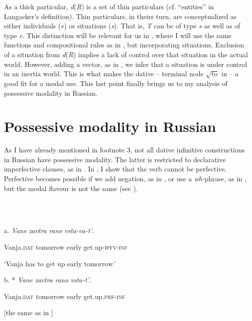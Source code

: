\documentclass[output=paper,colorlinks,citecolor=brown]{./langscibook}
\begin{document}
As a thick particular, \textit{d}(\textit{R}) is a set of thin particulars (cf. “entities” in Langacker’s definition). Thin particulars, in theirs turn, are conceptualized as either individuals (\textit{e}) or situations (\textit{s}). That is, \textit{T} can be of type \textit{s} as well as of type \textit{e}. This distinction will be relevant for us in , where I will use the same functions and compositional rules as in , but incorporating situations. Exclusion of a situation from \textit{d}(\textit{R}) implies a lack of control over that situation in the actual world. However, adding a vector, as in , we infer that a situation is under control in an inertia world. This is what makes the dative – terminal node  $\sqrt{\text{to}}$  in  – a good fit for a modal use. This last point finally brings us to my analysis of possessive modality in Russian.

\section{Possessive modality in Russian}\label{sec:tsedryk:4}

As I have already mentioned in footnote 3, not all dative infinitive constructions in Russian have possessive modality. The latter is restricted to declarative imperfective clauses, as in . In , I show that the verb cannot be perfective. Perfective becomes possible if we add negation, as in , or use a \textit{wh-}phrase, as in , but the modal flavour is not the same (see \citealt{Fortuin2007, Tsedryk2018}).

\ea%
    \label{ex:tsedryk:29}
    \gll\\
        \\
    \glt
    \z

          a.   \textit{Vane}\textbf{ }          \textit{zavtra}       \textit{rano}   \textit{vsta-va-t’}.

    Vanja.\textsc{dat}  tomorrow  early  get.up-\textsc{ipfv-inf}

  ‘Vanja has to get up early tomorrow.’  

  b.   *  \textit{Vane}\textbf{ }          \textit{zavtra}       \textit{rano}   \textit{vsta-t’}.

    Vanja.\textsc{dat}  tomorrow  early  get.up.\textsc{prf-inf}

  [the same as in ] 
\end{document}
